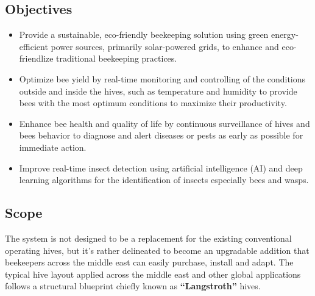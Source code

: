 \documentclass[12pt]{article}
\begin{document}
	\subsection{Objectives}
	
	\begin{itemize}
		\item Provide a sustainable, eco-friendly beekeeping solution using green energy-efficient power sources, primarily solar-powered grids, to enhance and eco-friendlize traditional beekeeping practices.
		
		\item Optimize bee yield by real-time monitoring and controlling of the conditions outside and inside the hives, such as temperature and humidity to provide bees with the most optimum conditions to maximize their productivity.
		
		\item Enhance bee health and quality of life by continuous surveillance of hives and bees behavior to diagnose and alert diseases or pests as early as possible for immediate action.
		
		\item Improve real-time insect detection using artificial intelligence (AI) and deep learning algorithms for the identification of insects especially bees and wasps.
		
	\end{itemize}
	\newpage
	\subsection{Scope}
	The system is not designed to be a replacement for the existing conventional operating hives, but it’s rather delineated to become an upgradable addition that beekeepers across the middle east can easily purchase, install and adapt.
	The typical hive layout applied across the middle east and other global applications follows a structural blueprint chiefly known as \textbf{“Langstroth”} hives. 
	\begin{table}[H]
		\centering
		\caption{Langstroth 10-frame box dimensions \cite{wood2024langstroth}}
		\vspace{0.25 cm}
		\label{tab:LANGSTROTH_DIMENSIONS}
	\end{table}
	
\end{document}
